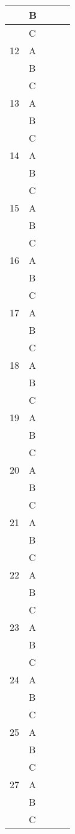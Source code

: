 \documentclass[12pt]{article}
\begin{document}
\begin{longtable}{ | p{1cm} | p{1cm} | p{3cm} | p{4cm} | p{4cm} | }
\hline
&B&&&\\
\hline
&C&&&\\
\hline
12&A&&&\\
\hline
&B&&&\\
\hline
&C&&&\\
\hline
13&A&&&\\
\hline
&B&&&\\
\hline
&C&&&\\
\hline
14&A&&&\\
\hline
&B&&&\\
\hline
&C&&&\\
\hline
15&A&&&\\
\hline
&B&&&\\
\hline
&C&&&\\
\hline
16&A&&&\\
\hline
&B&&&\\
\hline
&C&&&\\
\hline
17&A&&&\\
\hline
&B&&&\\
\hline
&C&&&\\
\hline
18&A&&&\\
\hline
&B&&&\\
\hline
&C&&&\\
\hline
19&A&&&\\
\hline
&B&&&\\
\hline
&C&&&\\
\hline
20&A&&&\\
\hline
&B&&&\\
\hline
&C&&&\\
\hline
21&A&&&\\
\hline
&B&&&\\
\hline
&C&&&\\
\hline
22&A&&&\\
\hline
&B&&&\\
\hline
&C&&&\\
\hline
23&A&&&\\
\hline
&B&&&\\
\hline
&C&&&\\
\hline
24&A&&&\\
\hline
&B&&&\\
\hline
&C&&&\\
\hline
25&A&&&\\
\hline
&B&&&\\
\hline
&C&&&\\
\hline
27&A&&&\\
\hline
&B&&&\\
\hline
&C&&&\\

\end{longtable}
\end{document}
